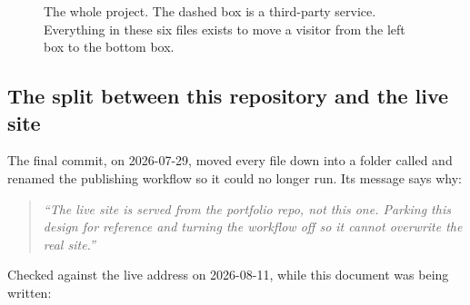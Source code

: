 \documentclass[11pt,a4paper]{article}
\begin{document}
\begin{figure}[H]\centering
{}
\caption{The whole project. The dashed box is a third-party service. Everything in
these six files exists to move a visitor from the left box to the bottom box.}
\end{figure}

\subsection{The split between this repository and the live site}

The final commit,  on 2026-07-29, moved every file down into a
folder called  and renamed the publishing workflow so
it could no longer run. Its message says why:

\begin{quote}
\emph{``The live site is served from the portfolio repo, not this one. Parking
this design for reference and turning the workflow off so it cannot overwrite the
real site.''}
\end{quote}

Checked against the live address on 2026-08-11, while this document was being
written:
\end{document}
